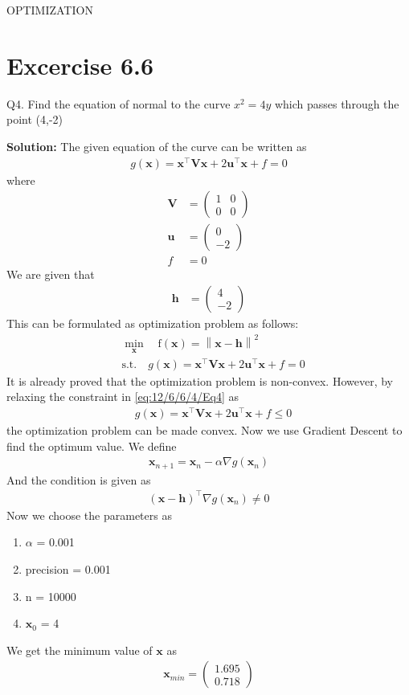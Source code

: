 \documentclass[12pt]{article}
\providecommand{\brak}[1]{\ensuremath{\left(#1\right)}}
\providecommand{\norm}[1]{\left\lVert#1\right\rVert}
\newcommand{\solution}{\noindent \textbf{Solution: }}
\newcommand{\myvec}[1]{\ensuremath{\begin{pmatrix}#1\end{pmatrix}}}
\let\vec\mathbf
\begin{document}
\begin{center}
\textbf\large{OPTIMIZATION}

\end{center}
\section*{Excercise 6.6}

Q4. Find the equation of normal to the curve $x^2=4y$ which passes through the point (4,-2)

\solution
\fi
The given equation of the curve can be written as  
\begin{align}
	\label{eq:12/6/6/4/parabolaEq2}
	g\brak{\vec{x}} = \vec{x}^\top\vec{V}\vec{x} + 2\vec{u}^\top\vec{x} + f = 0 
\end{align}
where
\begin{align}
	\vec{V} &= \myvec{ 1 & 0 \\ 0 & 0} \\
	\vec{u} &= \myvec{0 \\ -2} \\
	f &= 0 
\end{align}
We are given that 
\begin{align}
	\vec{h} &= \myvec{4 \\ -2}
\end{align}
This can be formulated as optimization problem as follows:
\begin{align}
	\label{eq:12/6/6/4/Eq3}
	&  \min_{\vec{x}} \quad \text{f}\brak{\vec{x}} = \norm{\vec{x}-\vec{h}}^2\\
	\label{eq:12/6/6/4/Eq4}
	& \text{s.t.}\quad g\brak{\vec{x}} = \vec{x}^\top\vec{V}\vec{x} + 2\vec{u}^\top\vec{x} + f = 0  
\end{align}
It is already proved that the optimization problem is non-convex. However, by relaxing the constraint in \eqref{eq:12/6/6/4/Eq4} as
\begin{align}
	\label{eq:12/6/6/4/Eq7}
	& g\brak{\vec{x}} = \vec{x}^\top\vec{V}\vec{x} + 2\vec{u}^\top\vec{x} + f \le 0  
\end{align}
the optimization problem can be made convex.
Now we use Gradient Descent to find the optimum value. We define
\begin{align}
	\vec{x}_{n+1} = \vec{x}_n - \alpha\nabla g\brak{\vec{x}_n}
\end{align}
And the condition is given as 
\begin{align}
	\brak{\vec{x}-\vec{h}}^\top\nabla g\brak{\vec{x}_n} \neq 0
\end{align}
Now we choose the parameters as
\begin{enumerate}
	\item $\alpha$ = 0.001
	\item precision = 0.001
	\item n = 10000
	\item $\vec{x}_0$ = 4
\end{enumerate}
We get the minimum value of $\vec{x}$ as
\begin{align}
	\vec{x}_{min} = \myvec{1.695\\0.718}
\end{align}
\end{document}
